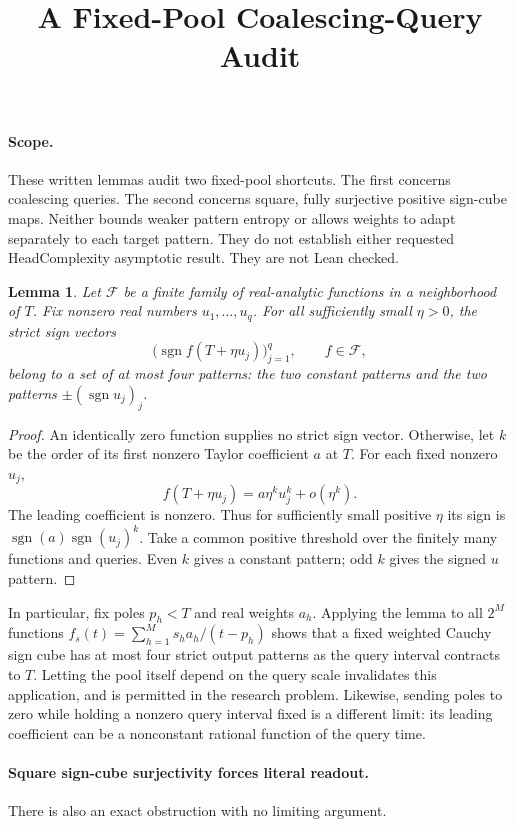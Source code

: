 \documentclass[11pt]{article}
\title{A Fixed-Pool Coalescing-Query Audit}
\author{}
\date{}
\newtheorem{lemma}{Lemma}
\begin{document}
\maketitle

\paragraph{Scope.}
These written lemmas audit two fixed-pool shortcuts. The first concerns
coalescing queries. The second concerns square, fully surjective positive
sign-cube maps. Neither bounds weaker pattern entropy or allows weights
to adapt separately to each target pattern. They do not establish either
requested HeadComplexity asymptotic result. They are not Lean checked.

\begin{lemma}
Let $\mathcal F$ be a finite family of real-analytic functions in a
neighborhood of $T$. Fix nonzero real numbers $u_1,\ldots,u_q$.
For all sufficiently small $\eta>0$, the strict sign vectors
\[
 \bigl(\operatorname{sgn}f(T+\eta u_j)\bigr)_{j=1}^q,
 \qquad f\in\mathcal F,
\]
belong to a set of at most four patterns: the two constant patterns and
the two patterns $\pm(\operatorname{sgn}u_j)_j$.
\end{lemma}
\begin{proof}
An identically zero function supplies no strict sign vector. Otherwise,
let $k$ be the order of its first nonzero Taylor coefficient $a$ at $T$.
For each fixed nonzero $u_j$,
\[
 f(T+\eta u_j)=a\eta^ku_j^k+o(\eta^k).
\]
The leading coefficient is nonzero. Thus for sufficiently small positive
$\eta$ its sign is $\operatorname{sgn}(a)\operatorname{sgn}(u_j)^k$.
Take a common positive threshold over the finitely many functions and
queries. Even $k$ gives a constant pattern; odd $k$ gives the signed
$u$ pattern.
\end{proof}

In particular, fix poles $p_h<T$ and real weights $a_h$. Applying the
lemma to all $2^M$ functions
$f_s(t)=\sum_{h=1}^M s_h a_h/(t-p_h)$ shows that a fixed weighted
Cauchy sign cube has at most four strict output patterns as the query
interval contracts to $T$. Letting the pool itself depend on the query
scale invalidates this application, and is permitted in the research
problem. Likewise, sending poles to zero while holding a nonzero query
interval fixed is a different limit: its leading coefficient can be a
nonconstant rational function of the query time.

\paragraph{Square sign-cube surjectivity forces literal readout.}
There is also an exact obstruction with no limiting argument.
\end{document}
